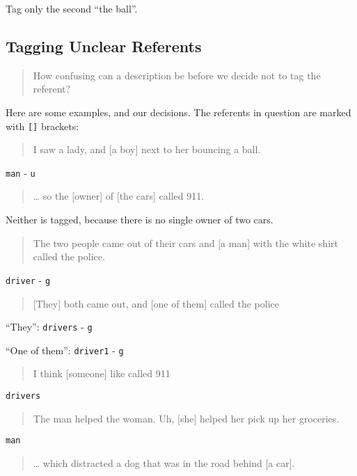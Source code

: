 \documentclass[
]{book}
\begin{document}
Tag only the second ``the ball''.

\hypertarget{tagging-unclear-referents}{%
\subsection{Tagging Unclear Referents}\label{tagging-unclear-referents}}

\begin{quote}
How confusing can a description be before we decide not to tag the referent?
\end{quote}

Here are some examples, and our decisions.
The referents in question are marked with \texttt{{[}{]}} brackets:

\begin{quote}
I saw a lady, and {[}a boy{]} next to her bouncing a ball.
\end{quote}

\texttt{man} - \texttt{u}

\begin{quote}
\ldots{} so the {[}owner{]} of {[}the cars{]} called 911.
\end{quote}

Neither is tagged, because there is no single owner of two cars.

\begin{quote}
The two people came out of their cars and {[}a man{]} with the white shirt called the police.
\end{quote}

\texttt{driver} - \texttt{g}

\begin{quote}
{[}They{]} both came out, and {[}one of them{]} called the police
\end{quote}

``They'': \texttt{drivers} - \texttt{g}

``One of them'': \texttt{driver1} - \texttt{g}

\begin{quote}
I think {[}someone{]} like called 911
\end{quote}

\texttt{drivers}

\begin{quote}
The man helped the woman. Uh, {[}she{]} helped her pick up her groceries.
\end{quote}

\texttt{man}

\begin{quote}
\ldots{} which distracted a dog that was in the road behind {[}a car{]}.
\end{quote}
\end{document}
